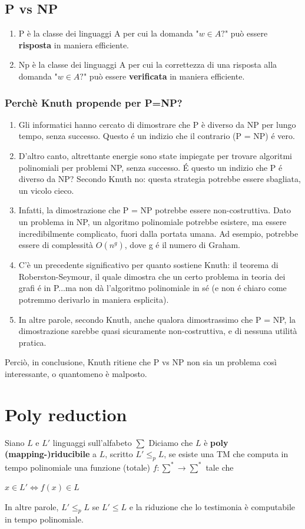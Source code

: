 \documentclass[a4paper, 12pt]{article}
\begin{document}
\subsection{P vs NP}
\begin{enumerate}
\item P \`e la classe dei linguaggi A per cui la domanda "$w \in A?$" pu\`o essere \textbf{risposta} in maniera efficiente.
\item Np \`e la classe dei linguaggi A per cui la correttezza di una risposta alla domanda "$w \in A?$" pu\`o essere \textbf{verificata} in maniera efficiente.
\end{enumerate}
\subsubsection{Perch\`e Knuth propende per P=NP?}
\begin{enumerate}
\item Gli informatici hanno cercato di dimostrare che P è diverso da NP per lungo tempo, senza successo. Questo é un indizio che il contrario (P = NP) é vero.
\item D’altro canto, altrettante energie sono state impiegate per trovare algoritmi polinomiali per problemi NP, senza successo. É questo un indizio che P é diverso da NP? Secondo Knuth no: questa strategia potrebbe essere sbagliata, un vicolo cieco.
\item Infatti, la dimostrazione che P = NP potrebbe essere non-costruttiva. Dato un problema in NP, un algoritmo polinomiale potrebbe esistere, ma essere incredibilmente complicato, fuori dalla portata umana. Ad esempio, potrebbe essere di complessità $O(n^g)$, dove g é il numero di Graham.
\item C’è un precedente significativo per quanto sostiene Knuth: il teorema di Roberston-Seymour, il quale dimostra che un certo problema in teoria dei grafi é in P...ma non dà l’algoritmo polinomiale in sé (e non é chiaro come potremmo
derivarlo in maniera esplicita).
\item In altre parole, secondo Knuth, anche qualora dimostrassimo che P = NP, la dimostrazione sarebbe quasi sicuramente non-costruttiva, e di nessuna utilità pratica.
\end{enumerate}
Perci\`o, in conclusione, Knuth ritiene che P vs NP non sia un problema cos\`i interessante, o quantomeno \`e malposto.
\newpage
\section{Poly reduction}
Siano $L$ e $L'$ linguaggi sull'alfabeto $\sum$ Diciamo che $L$ \`e \textbf{poly (mapping-)riducibile} a $L$, scritto $L' \leq_p L$, se esiste una TM che computa in tempo polinomiale una funzione (totale) $f: \sum^{*} \rightarrow \sum^{*}$ tale che \begin{center}
$x \in L' \iff f(x) \in L$
\end{center}
In altre parole, $L' \leq_p L$ se $L' \leq L$ e la riduzione che lo testimonia \`e computabile in tempo polinomiale.
\end{document}
